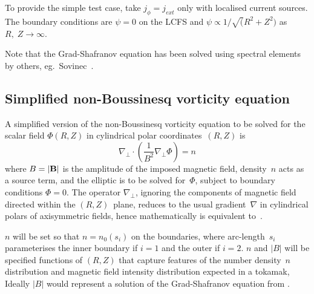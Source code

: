 To provide the simple test case, take $j_\phi=j_{ext}$ only with localised current sources.
The boundary conditions are $\psi=0$ on the LCFS
and $\psi \propto 1/\sqrt(R^2+Z^2)$ as $R,\;Z \rightarrow \infty$.

Note that the Grad-Shafranov equation has been solved using spectral elements by
others, eg.\ Sovinec~\cite{Ho14Solv}.

\subsection{Simplified non-Boussinesq vorticity equation} \label{sec:boussimp}
A simplified version of the non-Boussinesq vorticity equation to be solved for
the scalar field $\Phi(R,Z)$ in cylindrical polar coordinates~$(R,Z)$ is
\begin{equation}\label{eq:ellsimp}
\nabla_\perp \cdot \left( \frac{1}{B^2}  \nabla_\perp \Phi \right) = n
\end{equation}
where $B=|{\bf B}|$ is the amplitude of the imposed magnetic field,
density~$n$ acts as a source term, and the elliptic is to be solved
for~$\Phi$, subject to boundary conditions $\Phi=0$. The operator $\nabla_\perp$,
ignoring the components of magnetic field directed within the $(R,Z)$~plane,
reduces to the usual gradient~$\nabla$ in cylindrical polars of axisymmetric
fields, hence mathematically 
is equivalent to~.

$n$ will be set so that $n=n_0(s_i)$ on the boundaries,
where arc-length~$s_i$
parameterises the inner boundary if $i=1$ and the outer if $i=2$.
$n$ and $|B|$ will be specified functions of $(R,Z)$ that capture features
of the number density~$n$ distribution and magnetic field intensity distribution
expected in a tokamak,
Ideally $|B|$ would represent a solution of the Grad-Shafranov equation from .
